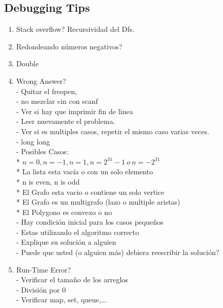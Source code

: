 \documentclass[7pt,twocolumn, landscape, letterpaper,bfseries]{article}
\begin{document}
\subsection*{Debugging Tips}
	\begin{enumerate}
		\item Stack overflow? Recursividad del Dfs.
		\item Redondeando n\'umeros negativos?
		\item Double
		\item Wrong Answer?\\
			- Quitar el freopen, \\
			- no mezclar cin con scanf\\
			- Ver si hay que imprimir fin de linea\\
			- Leer nuevamente el problema.\\
			- Ver si es multiples casos, repetir el mismo caso varias veces.\\ 
			- long long\\
			- Posibles Casos:\\
				* $n = 0,n = -1,n = 1,n = 2^{31} - 1 \  o \  n = -2^{31}$\\
				* La lista esta vac\'ia o con un solo elemento\\
				* n is even, n is odd\\
				* El Grafo esta vacio o contiene un solo vertice\\
				* El Grafo es un multigrafo (lazo o multiple aristas)\\
				* El Polygono es convexo o no\\
		- Hay condici\'on inicial para los casos pequeños\\
		- Estas utilizando el algoritmo correcto \\
		- Explique su soluci\'on a alguien\\
		- Puede que usted (o alguien más) debiera reescribir la 
		solución?
		\item Run-Time Error?\\
		- Verificar el tamaño de los arreglos\\
		- División por 0\\
		- Verificar map, set, queue,...
	\end{enumerate}
	
\end{document}
